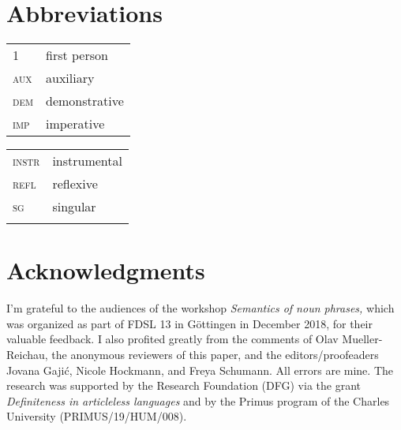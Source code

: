 \documentclass[output=paper,colorlinks,citecolor=brown,newtxmath]{langscibook}
\begin{document}
\section*{Abbreviations}

\begin{tabularx}{.5\textwidth}{@{}lX@{}}
\textsc{1}&first person\\
\textsc{aux}&auxiliary\\
\textsc{dem}&demonstrative\\
\textsc{imp}&imperative\\
\end{tabularx}%
\begin{tabularx}{.5\textwidth}{@{}lX@{}}
\textsc{instr}&instrumental\\
\textsc{refl}&reflexive\\
\textsc{sg}&singular\\
&\\
\end{tabularx}

\section*{Acknowledgments}
I'm grateful to the audiences of the workshop \textit{Semantics of noun phrases,} which was organized as part of FDSL 13 in Göttingen in December 2018, for their valuable feedback. I also profited greatly from the comments of Olav Mueller-Reichau, the anonymous reviewers of this paper, and the editors/proofeaders Jovana Gajić, Nicole Hockmann, and Freya Schumann. All errors are mine. The research was supported by the  Research Foundation (DFG) via the grant \textit{Definiteness in articleless  languages} and by the Primus program of the Charles University (PRIMUS/19/HUM/008).

{\sloppy\printbibliography[heading=subbibliography,notkeyword=this]}


\end{document}
